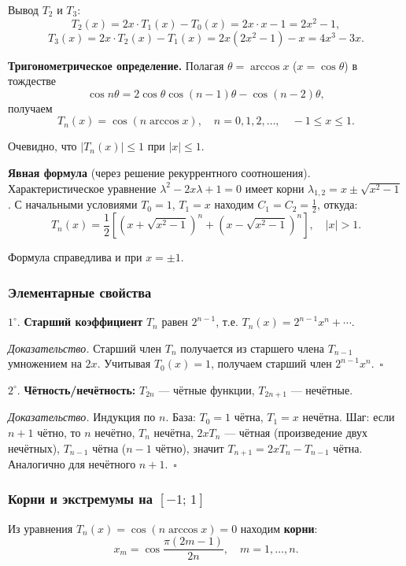 Вывод $T_2$ и $T_3$:
\[
    T_2(x) = 2x \cdot T_1(x) - T_0(x) = 2x \cdot x - 1 = 2x^2 - 1,
\]
\[
    T_3(x) = 2x \cdot T_2(x) - T_1(x) = 2x(2x^2 - 1) - x = 4x^3 - 3x.
\]

\textbf{Тригонометрическое определение.} Полагая $\theta = \arccos x$ ($x = \cos\theta$) в тождестве
\[
    \cos n\theta = 2\cos\theta \cos(n-1)\theta - \cos(n-2)\theta,
\]
получаем
\[
    T_n(x) = \cos(n \arccos x), \quad n = 0, 1, 2, \ldots, \quad -1 \leq x \leq 1.
\]

Очевидно, что $|T_n(x)| \leq 1$ при $|x| \leq 1$.

\textbf{Явная формула} (через решение рекуррентного соотношения). Характеристическое уравнение $\lambda^2 - 2x\lambda + 1 = 0$ имеет корни $\lambda_{1,2} = x \pm \sqrt{x^2 - 1}$. С начальными условиями $T_0 = 1$, $T_1 = x$ находим $C_1 = C_2 = \frac{1}{2}$, откуда:
\[
    T_n(x) = \frac{1}{2}\left[\left(x + \sqrt{x^2 - 1}\right)^n + \left(x - \sqrt{x^2 - 1}\right)^n\right], \quad |x| > 1.
\]

Формула справедлива и при $x = \pm 1$.

\subsubsection*{Элементарные свойства}

$1^\circ$. \textbf{Старший коэффициент} $T_n$ равен $2^{n-1}$, т.е. $T_n(x) = 2^{n-1} x^n + \cdots$.

\textit{Доказательство.} Старший член $T_n$ получается из старшего члена $T_{n-1}$ умножением на $2x$. Учитывая $T_0(x) = 1$, получаем старший член $2^{n-1} x^n$.~$\square$

$2^\circ$. \textbf{Чётность/нечётность:} $T_{2n}$ --- чётные функции, $T_{2n+1}$ --- нечётные.

\textit{Доказательство.} Индукция по $n$. База: $T_0 = 1$ чётна, $T_1 = x$ нечётна. Шаг: если $n+1$ чётно, то $n$ нечётно, $T_n$ нечётна, $2xT_n$ --- чётная (произведение двух нечётных), $T_{n-1}$ чётна ($n-1$ чётно), значит $T_{n+1} = 2xT_n - T_{n-1}$ чётна. Аналогично для нечётного $n+1$.~$\square$

\subsubsection*{Корни и экстремумы на $[-1;\,1]$}

Из уравнения $T_n(x) = \cos(n\arccos x) = 0$ находим \textbf{корни}:
\[
    x_m = \cos\frac{\pi(2m-1)}{2n}, \quad m = 1, \ldots, n.
\]

